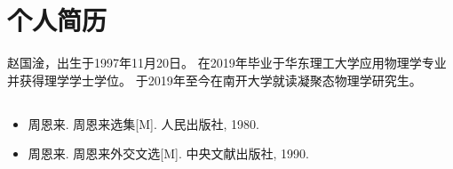 
\chapter*{个人简历}


{
	\fontsize{10.5bp}{16bp}\selectfont
	赵国淦，出生于1997年11月20日。
	在2019年毕业于华东理工大学应用物理学专业并获得理学学士学位。
	于2019年至今在南开大学就读凝聚态物理学研究生。
}


\section*{}

\begin{itemize}
	\fontsize{10.5bp}{16bp}\selectfont
	\item 周恩来. 周恩来选集[M]. 人民出版社, 1980.
	\item 周恩来. 周恩来外交文选[M]. 中央文献出版社, 1990.
\end{itemize}




